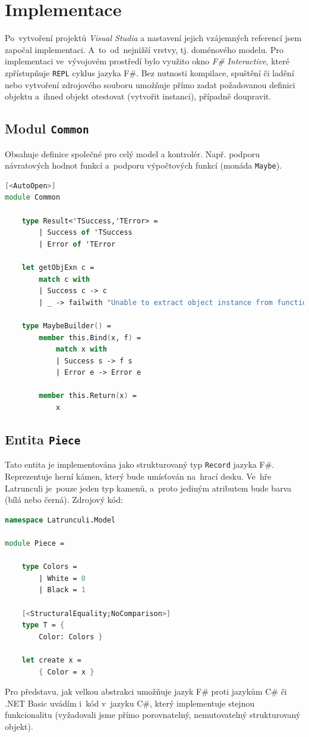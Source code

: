 \documentclass[12pt]{article}
\begin{document}
\section{Implementace}
Po~vytvoření projektů \emph{Visual Studia} a nastavení jejich vzájemných referencí jsem započal implementaci. A~to~od~nejnižší vrstvy, tj. doménového modelu. Pro implementaci ve~vývojovém prostředí bylo využito okno \emph{F\# Interactive}, které zpřístupňuje \texttt{REPL} cyklus jazyka F\#. Bez nutnosti kompilace, spuštění či ladění nebo vytvoření zdrojového souboru umožňuje přímo zadat požadovanou definici objektu a~ihned objekt otestovat (vytvořit instanci), případně doupravit.

\subsection{Modul \texttt{Common}}
Obsahuje definice společné pro celý model a kontrolér. Např. podporu návratových hodnot funkcí a~podporu výpočtových funkcí (monáda \texttt{Maybe}).
\begin{lstlisting}[language=FSharp]
[<AutoOpen>]
module Common

    type Result<'TSuccess,'TError> = 
        | Success of 'TSuccess 
        | Error of 'TError

    let getObjExn c =
        match c with
        | Success c -> c
        | _ -> failwith "Unable to extract object instance from function result, because called function has failed."

    type MaybeBuilder() =
        member this.Bind(x, f) = 
            match x with
            | Success s -> f s
            | Error e -> Error e

        member this.Return(x) = 
            x
\end{lstlisting}

\subsection{Entita \texttt{Piece}}
Tato entita je implementována jako strukturovaný typ \texttt{Record} jazyka F\#. Reprezentuje herní kámen, který bude umísťován na~hrací desku. Ve~hře Latrunculi je~pouze jeden typ kamenů, a~proto jediným atributem bude barva (bílá nebo černá).
Zdrojový kód:
\begin{lstlisting}[language=FSharp]
namespace Latrunculi.Model

module Piece =
    
    type Colors = 
        | White = 0
        | Black = 1

    [<StructuralEquality;NoComparison>]
    type T = {
        Color: Colors }
    
    let create x =
        { Color = x }
\end{lstlisting}
Pro představu, jak velkou abstrakci umožňuje jazyk F\# proti jazykům C\# či .NET Basic uvádím i~kód v~jazyku C\#, který implementuje stejnou funkcionalitu (vyžadovali jsme přímo porovnatelný, nemutovatelný strukturovaný objekt).
\end{document}
